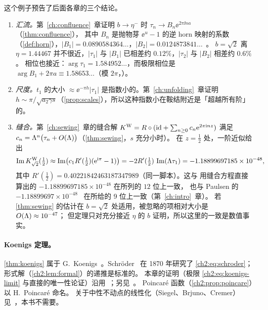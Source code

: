 这个例子预告了后面各章的三个结论。
\begin{enumerate}[label=(\arabic*)]
\item \emph{汇流。}第~\ref{ch:confluence}~章证明 $b\to\eta^-$ 时 $\tau_n\to B_n\ee^{2\pi\ii na}$（\cref{thm:confluence}），
  其中 $B_n$ 是抛物芽 $\ee^u-1$ 的逆 horn 映射的系数（\cref{def:horn}），$|B_1|=0.0890584364\ldots$，$|B_2|=0.0124873841\ldots$~\cite[\S2.1]{KneserPaper}。
  $b=\sqrt2$ 离 $\eta=1.44467$ 并不很近，$|\tau_1|$ 与 $|B_1|$ 已相差约 $0.12\%$，$|\tau_2|$ 与 $|B_2|$ 相差约 $0.6\%$。
  相位也接近：$\arg\tau_1=1.584952\ldots$，而极限相位是 $\arg B_1+2\pi a\equiv1.58653\ldots$（模 $2\pi$，\cite[\S2.1]{KneserPaper}）。
\item \emph{尺度。}$t_1$ 的大小 $\approx\ee^{-\pi h}|\tau_1|$ 是指数小的。第~\ref{ch:unfolding}~章证明 $h\sim\pi/\sqrt{a_2\gamma s}$（\cref{prop:scales}），所以这种指数小在鞍结附近是「超越所有阶」的。
\item \emph{缝合。}第~\ref{ch:sewing}~章的缝合解 $K^{\mathrm W}=R\circ(\mathrm{id}+\sum_{n\ge0}c_n\mathrm{e}^{2\pi\mathrm{i} nz})$ 满足 $c_n=\Lambda^n\bigl(\tau_n+O(\Lambda)\bigr)$（\cref{thm:sewing}，$s$ 充分小时）。
  在 $z=\frac12$ 处，一阶近似给出
  \[
    \operatorname{Im}K^{\mathrm W}_{\sqrt2}(\tfrac12)\approx\operatorname{Im}\bigl(c_1R'(\tfrac12)(\mathrm{e}^{\mathrm{i}\pi}-1)\bigr)=-2R'(\tfrac12)\,\operatorname{Im}(\Lambda\tau_1)=-1.18899697185\times10^{-48},
  \]
  其中 $R'(\frac12)=0.40221842463187347989$（同一脚本）。这与 \cite{KneserPaper} 用缝合方程直接算出的 $-1.18899697185\times10^{-48}$ 在所列的 $12$ 位上一致，
  也与 Paulsen 的 $-1.18899697\times10^{-48}$~\cite[\S6]{Paulsen2019} 在所给的 9 位上一致（第~\ref{ch:intro}~章）。
  若 \cref{thm:sewing} 的估计在 $b=\sqrt2$ 处适用，被忽略的项相对大小是 $O(\Lambda)\approx10^{-47}$；
  但定理只对充分接近 $\eta$ 的 $b$ 证明，所以这里的一致是数值事实。
\end{enumerate}

\notes

\paragraph{Koenigs 定理。}
\cref{thm:koenigs} 属于 G.~Koenigs~\cite{Koenigs1884}。Schröder~\cite{Schroder1870} 在 1870 年研究了 \eqref{ch2:eq:schroder}；形式解（\cref{ch2:lem:formal}）的递推是标准的。
本章的证明（极限 \eqref{ch2:eq:koenigs-limit} 与直接的唯一性论证）沿用~\cite[\S8]{Milnor2006}；另见~\cite[Ch.~II]{CarlesonGamelin1993}。
Poincaré 函数（\cref{ch2:prop:poincare}）以 H.~Poincaré 命名。
关于中性不动点的线性化（Siegel、Brjuno、Cremer）见~\cite[\S11]{Milnor2006}，本书不需要。

